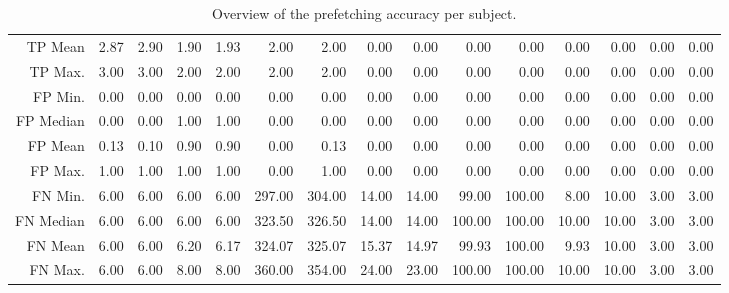 \begin{table}[ht]
\begin{tabular}{rrrrrrrrrrrrrrr}
  TP Mean & 2.87 & 2.90 & 1.90 & 1.93 & 2.00 & 2.00 & 0.00 & 0.00 & 0.00 & 0.00 & 0.00 & 0.00 & 0.00 & 0.00 \\ 
  TP Max. & 3.00 & 3.00 & 2.00 & 2.00 & 2.00 & 2.00 & 0.00 & 0.00 & 0.00 & 0.00 & 0.00 & 0.00 & 0.00 & 0.00 \\ 
  FP Min. & 0.00 & 0.00 & 0.00 & 0.00 & 0.00 & 0.00 & 0.00 & 0.00 & 0.00 & 0.00 & 0.00 & 0.00 & 0.00 & 0.00 \\ 
  FP Median & 0.00 & 0.00 & 1.00 & 1.00 & 0.00 & 0.00 & 0.00 & 0.00 & 0.00 & 0.00 & 0.00 & 0.00 & 0.00 & 0.00 \\ 
  FP Mean & 0.13 & 0.10 & 0.90 & 0.90 & 0.00 & 0.13 & 0.00 & 0.00 & 0.00 & 0.00 & 0.00 & 0.00 & 0.00 & 0.00 \\ 
  FP Max. & 1.00 & 1.00 & 1.00 & 1.00 & 0.00 & 1.00 & 0.00 & 0.00 & 0.00 & 0.00 & 0.00 & 0.00 & 0.00 & 0.00 \\ 
  FN Min. & 6.00 & 6.00 & 6.00 & 6.00 & 297.00 & 304.00 & 14.00 & 14.00 & 99.00 & 100.00 & 8.00 & 10.00 & 3.00 & 3.00 \\ 
  FN Median & 6.00 & 6.00 & 6.00 & 6.00 & 323.50 & 326.50 & 14.00 & 14.00 & 100.00 & 100.00 & 10.00 & 10.00 & 3.00 & 3.00 \\ 
  FN Mean & 6.00 & 6.00 & 6.20 & 6.17 & 324.07 & 325.07 & 15.37 & 14.97 & 99.93 & 100.00 & 9.93 & 10.00 & 3.00 & 3.00 \\ 
  FN Max. & 6.00 & 6.00 & 8.00 & 8.00 & 360.00 & 354.00 & 24.00 & 23.00 & 100.00 & 100.00 & 10.00 & 10.00 & 3.00 & 3.00 \\ 
   \hline
\end{tabular}
\caption{Overview of the prefetching accuracy per subject.} 
\label{tab:results:rq3:summary:subject}
\end{table}
